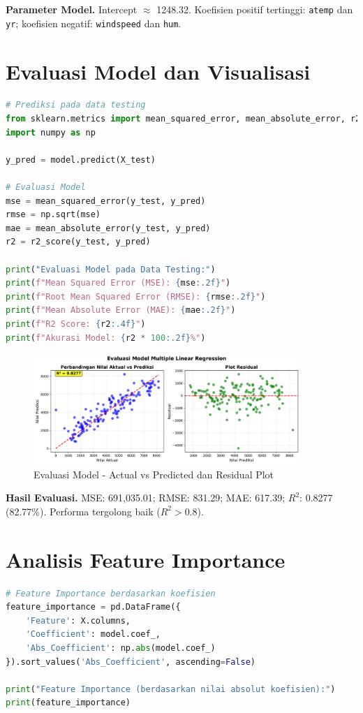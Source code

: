 \documentclass[11pt,a4paper]{article}
\begin{document}
\noindent\textbf{Parameter Model.}
Intercept $\approx$ 1248{.}32. Koefisien positif tertinggi: \texttt{atemp} dan \texttt{yr}; koefisien negatif: \texttt{windspeed} dan \texttt{hum}.

\section{Evaluasi Model dan Visualisasi}
\begin{lstlisting}[language=Python]
# Prediksi pada data testing
from sklearn.metrics import mean_squared_error, mean_absolute_error, r2_score
import numpy as np

y_pred = model.predict(X_test)

# Evaluasi Model
mse = mean_squared_error(y_test, y_pred)
rmse = np.sqrt(mse)
mae = mean_absolute_error(y_test, y_pred)
r2 = r2_score(y_test, y_pred)

print("Evaluasi Model pada Data Testing:")
print(f"Mean Squared Error (MSE): {mse:.2f}")
print(f"Root Mean Squared Error (RMSE): {rmse:.2f}")
print(f"Mean Absolute Error (MAE): {mae:.2f}")
print(f"R2 Score: {r2:.4f}")
print(f"Akurasi Model: {r2 * 100:.2f}%")
\end{lstlisting}

\begin{figure}[h]
    \centering
    \includegraphics[width=0.9\textwidth]{./OUTPUT/step8_model_evaluation.png}
    \caption{Evaluasi Model - Actual vs Predicted dan Residual Plot}
    \label{fig:model_evaluation}
\end{figure}

\noindent\textbf{Hasil Evaluasi.}
MSE: 691{,}035{.}01; RMSE: 831{.}29; MAE: 617{.}39; $R^2$: 0{.}8277 (82{.}77\%). Performa tergolong baik ($R^2>0.8$).

\section{Analisis Feature Importance}
\begin{lstlisting}[language=Python]
# Feature Importance berdasarkan koefisien
feature_importance = pd.DataFrame({
    'Feature': X.columns,
    'Coefficient': model.coef_,
    'Abs_Coefficient': np.abs(model.coef_)
}).sort_values('Abs_Coefficient', ascending=False)

print("Feature Importance (berdasarkan nilai absolut koefisien):")
print(feature_importance)
\end{lstlisting}
\end{document}
